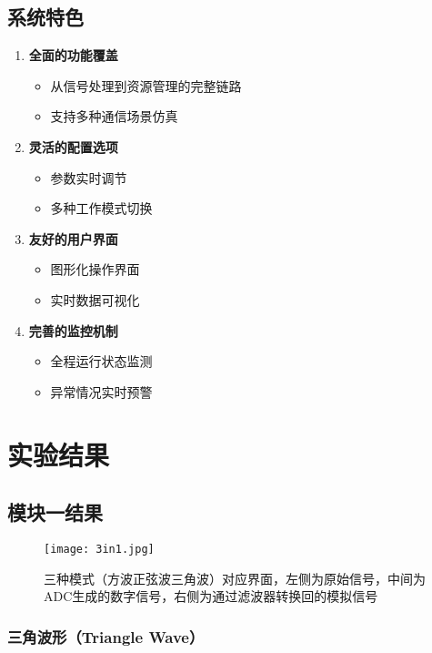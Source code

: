 \documentclass[12pt]{article}
\begin{document}
\subsection{系统特色}
\begin{enumerate}
    \item \textbf{全面的功能覆盖}
    \begin{itemize}
        \item 从信号处理到资源管理的完整链路
        \item 支持多种通信场景仿真
    \end{itemize}
    
    \item \textbf{灵活的配置选项}
    \begin{itemize}
        \item 参数实时调节
        \item 多种工作模式切换
    \end{itemize}
    
    \item \textbf{友好的用户界面}
    \begin{itemize}
        \item 图形化操作界面
        \item 实时数据可视化
    \end{itemize}
    
    \item \textbf{完善的监控机制}
    \begin{itemize}
        \item 全程运行状态监测
        \item 异常情况实时预警
    \end{itemize}
\end{enumerate}

\section{实验结果}
\subsection{模块一结果}


\begin{figure}[H]
    \centering
    \texttt{[image: 3in1.jpg]}
    \caption{三种模式（方波正弦波三角波）对应界面，左侧为原始信号，中间为ADC生成的数字信号，右侧为通过滤波器转换回的模拟信号}
    \label{fig:enter-label}
\end{figure}

\subsubsection{三角波形（Triangle Wave）}
\end{document}
